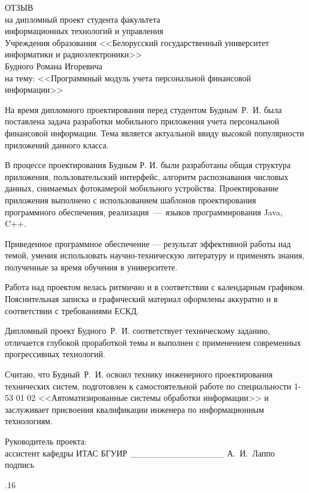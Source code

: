 \documentclass[a4paper,hidelinks,14pt]{extarticle}
\begin{document}
\thispagestyle{empty}

\begin{center}
  ОТЗЫВ \\
  на дипломный проект студента факультета \\
  информационных технологий и управления \\
  Учреждения образования <<Белорусский государственный университет
  информатики и радиоэлектроники>> \\
  Будного Романа Игоревича \\
  на тему: <<Программный модуль учета персональной финансовой информации>>
\end{center}

На время дипломного проектирования перед студентом Будным~Р.~И.
была поставлена задача разработки мобильного приложения учета персональной
финансовой информации. Тема является актуальной ввиду высокой популярности
приложений данного класса.

В процессе проектирования Будным Р. И. были разработаны общая структура приложения,
пользовательский интерфейс, алгоритм распознавания числовых данных,
снимаемых фотокамерой мобильного устройства.
Проектирование приложения выполнено с использованием шаблонов проектирования
программного обеспечения, реализация~---~языков программирования Java, C++.

Приведенное программное обеспечение --- результат эффективной работы над темой,
умения использовать научно-техническую литературу
и применять знания, полученные за время обучения в университете.

Работа над проектом велась ритмично и в соответствии с календарным графиком.
Пояснительная записка и графический материал оформлены аккуратно
и в соответствии с требованиями ЕСКД.

Дипломный проект Будного~Р.~И. соответствует техническому заданию,
отличается глубокой проработкой темы и выполнен с применением современных
прогрессивных технологий.

Считаю, что Будный~Р.~И. освоил технику инженерного проектирования
технических систем, подготовлен к самостоятельной работе по специальности 1-53 01 02
<<Автоматизированные системы обработки информации>> и заслуживает
присвоения квалификации инженера по информационным технологиям.

\bigskip
\noindent Руководитель проекта: \\
\noindent ассистент кафедры ИТАС БГУИР \_\_\_\_\_\_\_\_\_\_\_\_\_\_\_ А.~И.~Лаппо \\
\hspace*{8.5cm} {\small подпись}

.16
\end{document}

